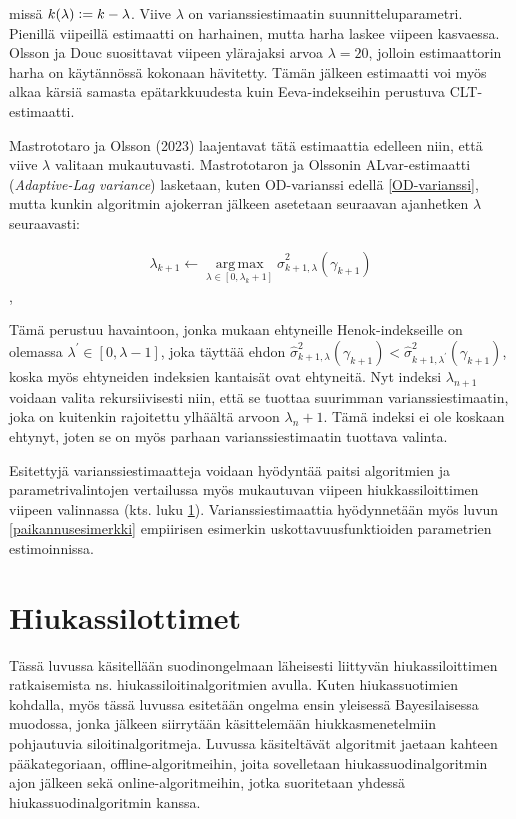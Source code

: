\documentclass[
  12pt,
  a4paper, twoside]{book}
\begin{document}
missä \(k(\lambda) \vcentcolon= k-\lambda\). Viive \(\lambda\) on varianssiestimaatin suunnitteluparametri. Pienillä viipeillä estimaatti on harhainen, mutta harha laskee viipeen kasvaessa. Olsson ja Douc suosittavat viipeen ylärajaksi arvoa \(\lambda=20\), jolloin estimaattorin harha on käytännössä kokonaan hävitetty. Tämän jälkeen estimaatti voi myös alkaa kärsiä samasta epätarkkuudesta kuin Eeva-indekseihin perustuva CLT-estimaatti.

Mastrototaro ja Olsson (2023) \citep{Mastrototaro-2023} laajentavat tätä estimaattia edelleen niin, että viive \(\lambda\) valitaan mukautuvasti. Mastrototaron ja Olssonin ALvar-estimaatti (\emph{Adaptive-Lag variance}) lasketaan, kuten OD-varianssi edellä \ref{OD-varianssi}, mutta kunkin algoritmin ajokerran jälkeen asetetaan seuraavan ajanhetken \(\lambda\) seuraavasti:

\begin{align}\label{ALvar-lambda}
\lambda_{k+1} \leftarrow \operatorname*{arg\,max}_{\lambda \in [0, \lambda_k + 1]} \hat{\sigma}^2_{k+1,\lambda} (\gamma_{k+1})
\end{align},

Tämä perustuu havaintoon, jonka mukaan ehtyneille Henok-indekseille on olemassa \(\lambda^\prime \in [0, \lambda-1]\), joka täyttää ehdon \(\hat{\sigma}^2_{k+1,\lambda} (\gamma_{k+1}) < \hat{\sigma}^2_{k+1,\lambda^\prime} (\gamma_{k+1})\), koska myös ehtyneiden indeksien kantaisät ovat ehtyneitä. Nyt indeksi \(\lambda_{n+1}\) voidaan valita rekursiivisesti niin, että se tuottaa suurimman varianssiestimaatin, joka on kuitenkin rajoitettu ylhäältä arvoon \(\lambda_n+1\). Tämä indeksi ei ole koskaan ehtynyt, joten se on myös parhaan varianssiestimaatin tuottava valinta.

Esitettyjä varianssiestimaatteja voidaan hyödyntää paitsi algoritmien ja parametrivalintojen vertailussa myös mukautuvan viipeen hiukkassiloittimen viipeen valinnassa (kts. luku \ref{hiukkassiloittimet}). Varianssiestimaattia hyödynnetään myös luvun \ref{paikannusesimerkki} empiirisen esimerkin uskottavuusfunktioiden parametrien estimoinnissa.

\chapter{Hiukassilottimet} \label{hiukkassiloittimet}

Tässä luvussa käsitellään suodinongelmaan läheisesti liittyvän hiukassiloittimen ratkaisemista ns. hiukassiloitinalgoritmien avulla. Kuten hiukassuotimien kohdalla, myös tässä luvussa esitetään ongelma ensin yleisessä Bayesilaisessa muodossa, jonka jälkeen siirrytään käsittelemään hiukkasmenetelmiin pohjautuvia siloitinalgoritmeja. Luvussa käsiteltävät algoritmit jaetaan kahteen pääkategoriaan, offline-algoritmeihin, joita sovelletaan hiukassuodinalgoritmin ajon jälkeen sekä online-algoritmeihin, jotka suoritetaan yhdessä hiukassuodinalgoritmin kanssa.
\end{document}
